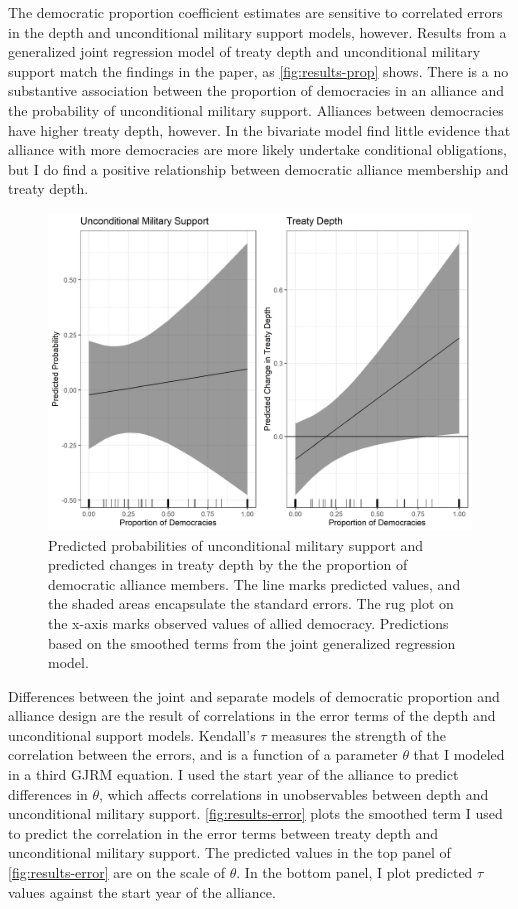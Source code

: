 \documentclass[12pt]{article}
\begin{document}
The democratic proportion coefficient estimates are sensitive to correlated errors in the depth and unconditional military support models, however. 
Results from a generalized joint regression model of treaty depth and unconditional military support match the findings in the paper, as \autoref{fig:results-prop} shows. 
There is a no substantive association between the proportion of democracies in an alliance and the probability of unconditional military support. 
Alliances between democracies have higher treaty depth, however. 
In the bivariate model find little evidence that alliance with more democracies are more likely undertake conditional obligations, but I do find a positive relationship between democratic alliance membership and treaty depth. 


\begin{figure}
\includegraphics[width=.95\textwidth]{results-prop.png}  
\caption{Predicted probabilities of unconditional military support and predicted changes in treaty depth by the the proportion of democratic alliance members. The line marks predicted values, and the shaded areas encapsulate the standard errors. The rug plot on the x-axis marks observed values of allied democracy. Predictions based on the smoothed terms from the joint generalized regression model.}
\label{fig:results-prop}
\end{figure}



Differences between the joint and separate models of democratic proportion and alliance design are the result of correlations in the error terms of the depth and unconditional support models.  
Kendall's $\tau$ measures the strength of the correlation between the errors, and is a function of a parameter $\theta$ that I modeled in a third GJRM equation.
I used the start year of the alliance to predict differences in $\theta$, which affects correlations in unobservables between depth and unconditional military support. 
\autoref{fig:results-error} plots the smoothed term I used to predict the correlation in the error terms between treaty depth and unconditional military support. 
The predicted values in the top panel of \autoref{fig:results-error} are on the scale of $\theta$. 
In the bottom panel, I plot predicted $\tau$ values against the start year of the alliance. 
\end{document}
